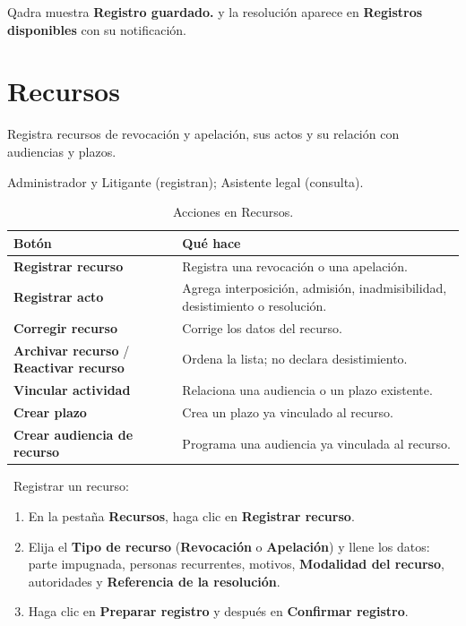 \resultado Qadra muestra \textbf{Registro guardado.} y la resolución aparece
en \textbf{Registros disponibles} con su notificación.

\section{Recursos}\label{sec:recursos}

\paraque Registra recursos de revocación y apelación, sus actos y su
relación con audiencias y plazos.

\disponible Administrador y Litigante (registran); Asistente legal
(consulta).

\begin{table}[H]
  \centering
  \caption{Acciones en Recursos.}\label{tab:acciones-recursos}
  \begin{tabularx}{\textwidth}{L{4.8cm} Y}
    \toprule
    \textbf{Botón} & \textbf{Qué hace} \\
    \midrule
    \textbf{Registrar recurso}             & Registra una revocación o una apelación. \\
    \textbf{Registrar acto}                & Agrega interposición, admisión, inadmisibilidad, desistimiento o resolución. \\
    \textbf{Corregir recurso}              & Corrige los datos del recurso. \\
    \textbf{Archivar recurso} / \textbf{Reactivar recurso}
                                           & Ordena la lista; no declara desistimiento. \\
    \textbf{Vincular actividad}            & Relaciona una audiencia o un plazo existente. \\
    \textbf{Crear plazo}                   & Crea un plazo ya vinculado al recurso. \\
    \textbf{Crear audiencia de recurso}    & Programa una audiencia ya vinculada al recurso. \\
    \bottomrule
  \end{tabularx}
\end{table}

\pasos\ Registrar un recurso:
\begin{enumerate}
  \item En la pestaña \textbf{Recursos}, haga clic en
        \textbf{Registrar recurso}.
  \item Elija el \textbf{Tipo de recurso} (\textbf{Revocación} o
        \textbf{Apelación}) y llene los datos: parte impugnada, personas
        recurrentes, motivos, \textbf{Modalidad del recurso}, autoridades y
        \textbf{Referencia de la resolución}.
  \item Haga clic en \textbf{Preparar registro} y después en
        \textbf{Confirmar registro}.
\end{enumerate}

